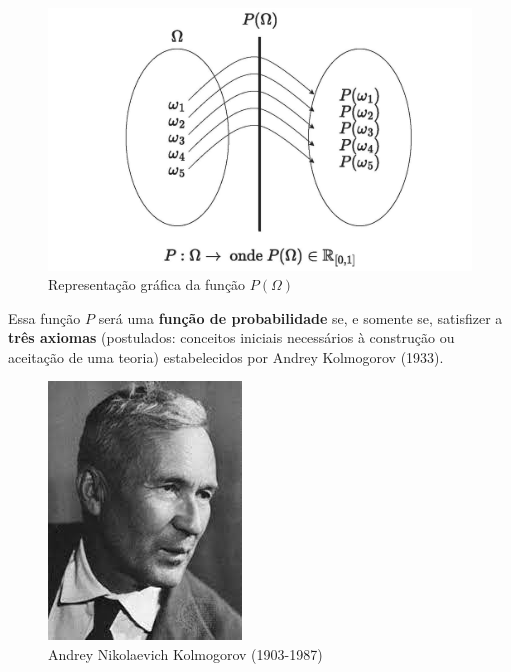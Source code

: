 \documentclass[
]{book}
\begin{document}
\begin{figure}

{\centering \includegraphics[width=0.8\linewidth]{images4/funcao_probabilidade} 

}

\caption{Representação gráfica da função $P(\Omega)$}\label{fig:unnamed-chunk-68}
\end{figure}

\hfill\break

Essa função \(P\) será uma \textbf{função de probabilidade} se, e somente se, satisfizer a \textbf{três axiomas} (postulados: conceitos iniciais necessários à construção ou aceitação de uma teoria) estabelecidos por Andrey Kolmogorov (1933).

\hfill\break

\begin{figure}

{\centering \includegraphics[width=0.4\linewidth]{images4/kolmogorov} 

}

\caption{Andrey Nikolaevich Kolmogorov  (1903-1987)}\label{fig:unnamed-chunk-69}
\end{figure}

\hfill\break
\end{document}
